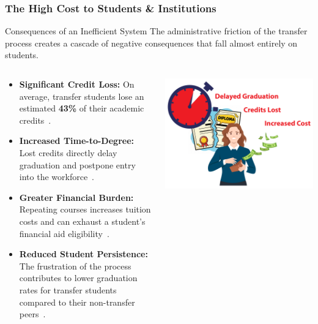 \documentclass[aspectratio=169,10pt]{beamer}
\begin{document}
\begin{frame}
    \frametitle{The High Cost to Students \& Institutions}
    
    \begin{alertblock}{Consequences of an Inefficient System}
        The administrative friction of the transfer process creates a cascade of negative consequences that fall almost entirely on students.
    \end{alertblock}
    
    \begin{columns}[T]
        \begin{column}{0.6\textwidth}
            \begin{itemize}
                \item \textbf{Significant Credit Loss:} On average, transfer students lose an estimated \textbf{43\%} of their academic credits~\cite{gao2017, publicagenda2025}.
                
                \item \textbf{Increased Time-to-Degree:} Lost credits directly delay graduation and postpone entry into the workforce~\cite{gao2017}.
                
                \item \textbf{Greater Financial Burden:} Repeating courses increases tuition costs and can exhaust a student's financial aid eligibility~\cite{gao2017, collegeopportunity2017}.
                
                \item \textbf{Reduced Student Persistence:} The frustration of the process contributes to lower graduation rates for transfer students compared to their non-transfer peers~\cite{porter1999}.
            \end{itemize}
        \end{column}
        
        \begin{column}{0.4\textwidth}
            
            \centering
            \includegraphics[width=\textwidth]{high_cost.pdf} %
            

\end{column}
\end{columns}
\end{frame}
\end{document}
